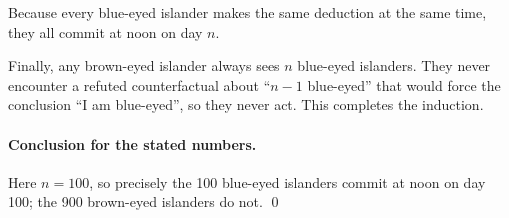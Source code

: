 Because every blue-eyed islander makes the same deduction at the same time, they all commit at noon on day $n$.

Finally, any brown-eyed islander always sees $n$ blue-eyed islanders. They never encounter a refuted
counterfactual about ``$n-1$ blue-eyed'' that would force the conclusion ``I am blue-eyed'',
so they never act. This completes the induction.

\paragraph{Conclusion for the stated numbers.}
Here $n=100$, so precisely the 100 blue-eyed islanders commit at noon on day 100; the 900 brown-eyed islanders do not.
\qed
